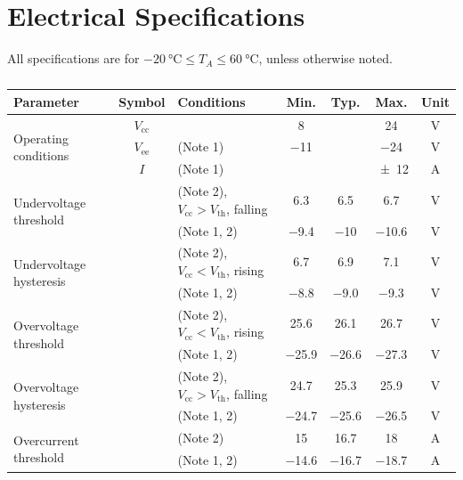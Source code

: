\documentclass[10pt]{datasheet}
\begin{document}
\section{Electrical Specifications}
All specifications are for $\qty{-20}{\celsius} \leq T_A \leq \qty{60}{\celsius}$, unless otherwise noted.
\begin{table}[h!]
    \caption{}
    \begin{threeparttable}
        \begin{tabularx}{\textwidth}{l | c | X | c c c | c}
            \thickhline
            \textbf{Parameter} & \textbf{Symbol} & \textbf{Conditions} & \textbf{Min.} & \textbf{Typ.} & \textbf{Max.} &
            \textbf{Unit} \\
            \hline
            \multirow{3}{*}{Operating conditions}  & $V_\text{cc}$ &  & \num{8} & & \num{24} & \unit{\V} \\
            & $V_\text{ee}$ & (Note 1) & \num{-11} & & \num{-24} & \unit{V} \\
            & $I$ & (Note 1) & & & \num{\pm 12} & \unit{\A} \\
            \hline
            \multirow{2}{*}{Undervoltage threshold} & & (Note 2), $V_\text{cc} > V_\text{th}$, falling & \num{6.3} & \num{6.5} & \num{6.7} & \unit{\V} \\
             & & (Note 1, 2) & \num{-9.4} & \num{-10} & \num{-10.6} & \unit{\V} \\
            \multirow{2}{*}{Undervoltage hysteresis} & &(Note 2), $V_\text{cc} < V_\text{th}$, rising & \num{6.7} & \num{6.9} & \num{7.1} & \unit{\V} \\
             & & (Note 1, 2)  & \num{-8.8} & \num{-9.0} & \num{-9.3} & \unit{\V} \\
            \multirow{2}{*}{Overvoltage threshold} & & (Note 2), $V_\text{cc} < V_\text{th}$, rising & \num{25.6} & \num{26.1}& \num{26.7} & \unit{\V} \\
             & & (Note 1, 2) & \num{-25.9} & \num{-26.6}& \num{-27.3} & \unit{\V} \\
            \multirow{2}{*}{Overvoltage hysteresis} & & (Note 2), $V_\text{cc} > V_\text{th}$, falling & \num{24.7} & \num{25.3}& \num{25.9} & \unit{\V} \\
             & & (Note 1, 2) & \num{-24.7} & \num{-25.6}& \num{-26.5} & \unit{\V} \\
            \multirow{2}{*}{Overcurrent threshold} & & (Note 2) & \num{15} & \num{16.7} & \num{18} & \unit{\A} \\
             & & (Note 1, 2) & \num{-14.6} & \num{-16.7} & \num{-18.7} & \unit{\A} \\

\end{tabularx}
\end{threeparttable}
\end{table}
\end{document}
